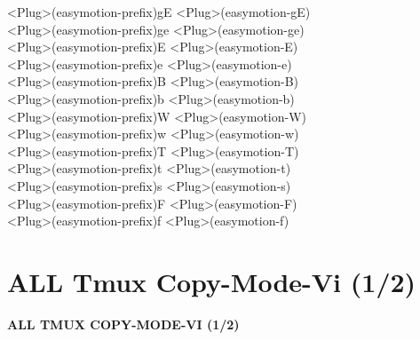 \documentclass[11pt,a4paper,twoside]{book}
\begin{document}
<Plug>(easymotion-prefix)gE  <Plug>(easymotion-gE)\\
<Plug>(easymotion-prefix)ge  <Plug>(easymotion-ge)\\
<Plug>(easymotion-prefix)E  <Plug>(easymotion-E)\\
<Plug>(easymotion-prefix)e  <Plug>(easymotion-e)\\
<Plug>(easymotion-prefix)B  <Plug>(easymotion-B)\\
<Plug>(easymotion-prefix)b  <Plug>(easymotion-b)\\
<Plug>(easymotion-prefix)W  <Plug>(easymotion-W)\\
<Plug>(easymotion-prefix)w  <Plug>(easymotion-w)\\
<Plug>(easymotion-prefix)T  <Plug>(easymotion-T)\\
<Plug>(easymotion-prefix)t  <Plug>(easymotion-t)\\
<Plug>(easymotion-prefix)s  <Plug>(easymotion-s)\\
<Plug>(easymotion-prefix)F  <Plug>(easymotion-F)\\
<Plug>(easymotion-prefix)f  <Plug>(easymotion-f)\\


\vspace{16pt}

\section{ALL Tmux Copy-Mode-Vi (1/2)}


\vspace{10pt}
{\large\bfseries\color{neoncyan} ALL TMUX COPY-MODE-VI (1/2)}\vspace{6pt}
\end{document}
